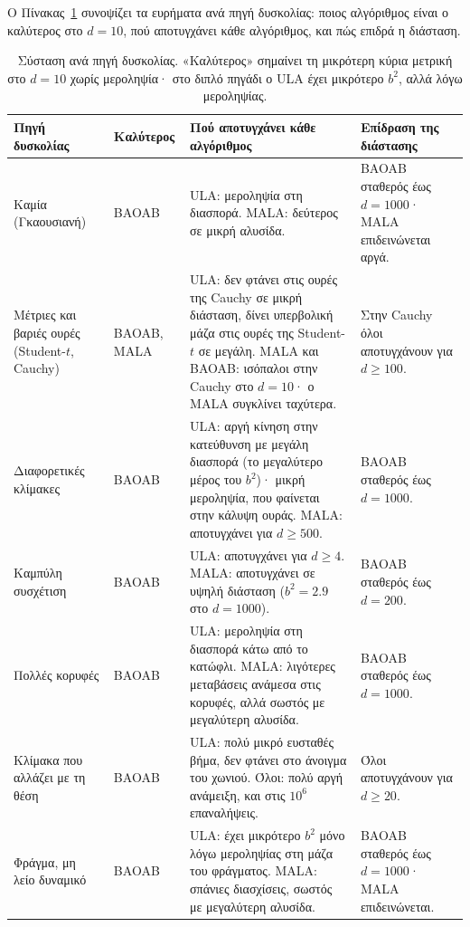 Ο Πίνακας~\ref{tab:recommendation} συνοψίζει τα ευρήματα ανά πηγή δυσκολίας: ποιος
αλγόριθμος είναι ο καλύτερος στο $d=10$, πού αποτυγχάνει κάθε αλγόριθμος, και πώς
επιδρά η διάσταση.

\begin{table}[H]
\centering
\footnotesize
\begin{tabular}{p{2.3cm}p{1.7cm}p{6.0cm}p{3.6cm}}
\toprule
Πηγή δυσκολίας & Καλύτερος & Πού αποτυγχάνει κάθε αλγόριθμος & Επίδραση της διάστασης \\
\midrule
Καμία (Γκαουσιανή) & BAOAB & ULA: μεροληψία στη διασπορά. MALA: δεύτερος σε μικρή αλυσίδα. & BAOAB σταθερός έως $d=1000$· MALA επιδεινώνεται αργά. \\
\addlinespace
Μέτριες και βαριές ουρές (Student-$t$, Cauchy) & BAOAB, MALA & ULA: δεν φτάνει στις ουρές της Cauchy σε μικρή διάσταση, δίνει υπερβολική μάζα στις ουρές της Student-$t$ σε μεγάλη. MALA και BAOAB: ισόπαλοι στην Cauchy στο $d=10$· ο MALA συγκλίνει ταχύτερα. & Στην Cauchy όλοι αποτυγχάνουν για $d \ge 100$. \\
\addlinespace
Διαφορετικές κλίμακες & BAOAB & ULA: αργή κίνηση στην κατεύθυνση με μεγάλη διασπορά (το μεγαλύτερο μέρος του $b^2$)· μικρή μεροληψία, που φαίνεται στην κάλυψη ουράς. MALA: αποτυγχάνει για $d \ge 500$. & BAOAB σταθερός έως $d=1000$. \\
\addlinespace
Καμπύλη συσχέτιση & BAOAB & ULA: αποτυγχάνει για $d \ge 4$. MALA: αποτυγχάνει σε υψηλή διάσταση ($b^2 = 2.9$ στο $d=1000$). & BAOAB σταθερός έως $d=200$. \\
\addlinespace
Πολλές κορυφές & BAOAB & ULA: μεροληψία στη διασπορά κάτω από το κατώφλι. MALA: λιγότερες μεταβάσεις ανάμεσα στις κορυφές, αλλά σωστός με μεγαλύτερη αλυσίδα. & BAOAB σταθερός έως $d=1000$. \\
\addlinespace
Κλίμακα που αλλάζει με τη θέση & BAOAB & ULA: πολύ μικρό ευσταθές βήμα, δεν φτάνει στο άνοιγμα του χωνιού. Όλοι: πολύ αργή ανάμειξη, και στις $10^6$ επαναλήψεις. & Όλοι αποτυγχάνουν για $d \ge 20$. \\
\addlinespace
Φράγμα, μη λείο δυναμικό & BAOAB & ULA: έχει μικρότερο $b^2$ μόνο λόγω μεροληψίας στη μάζα του φράγματος. MALA: σπάνιες διασχίσεις, σωστός με μεγαλύτερη αλυσίδα. & BAOAB σταθερός έως $d=1000$· MALA επιδεινώνεται. \\
\bottomrule
\end{tabular}
\caption{Σύσταση ανά πηγή δυσκολίας. «Καλύτερος» σημαίνει τη μικρότερη κύρια μετρική
στο $d=10$ χωρίς μεροληψία· στο διπλό πηγάδι ο ULA έχει μικρότερο $b^2$, αλλά λόγω
μεροληψίας.}
\label{tab:recommendation}
\end{table}

